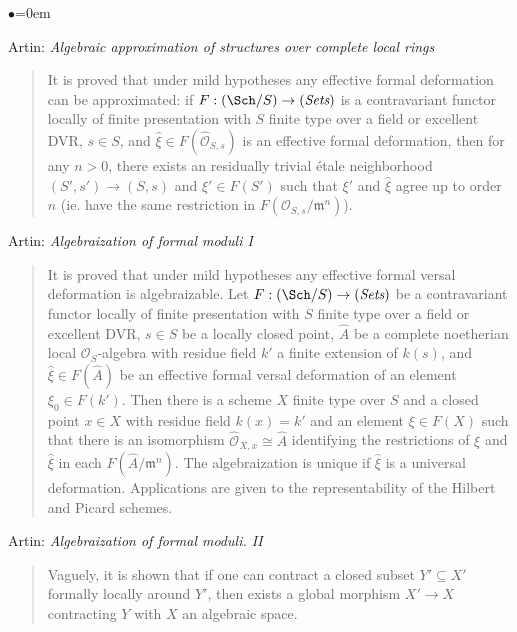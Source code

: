 \begin{list}{$\bullet$}{\leftmargin=0em}
\item Artin: \emph{Algebraic approximation of structures over
complete local rings} \cite{Artin-Algebraic-Approximation}
\begin{quote}
It is proved that under mild hypotheses any effective formal deformation can be
approximated: if $F: (\Sch/S) \to (\textit{Sets})$
is a contravariant functor
locally of finite presentation with $S$ finite type over a field or excellent
DVR, $s \in S$, and $\hat{\xi} \in F(\hat{\mathcal{O}}_{S, s})$ is an effective
formal
deformation, then for any $n > 0$, there exists an residually trivial \'etale
neighborhood $(S', s') \to (S, s)$ and $\xi' \in F(S')$ such that $\xi'$ and
$\hat{\xi}$ agree up to order $n$ (ie. have the same restriction in
$F(\mathcal{O}_{S, s} / \mathfrak m^n)$).
\end{quote}
\smallskip
\item
Artin: \emph{Algebraization of formal moduli I} \cite{ArtinI}
\begin{quote}
It is proved that under mild hypotheses any effective formal versal deformation
is algebraizable. Let $F: (\Sch/S) \to (\textit{Sets})$ be a
contravariant functor
locally of finite presentation with $S$ finite type over a field or excellent
DVR, $s \in S$ be a locally closed point, $\hat A$ be a complete noetherian
local $\mathcal{O}_S$-algebra with residue field $k'$ a finite extension of
$k(s)$,
and $\hat{\xi} \in F(\hat A)$ be an effective formal versal deformation of an
element $\xi_0 \in F(k')$. Then there is a scheme $X$ finite type over $S$ and
a closed point $x \in X$ with residue field $k(x) = k'$ and an element $\xi \in
F(X)$ such that there is an isomorphism $\hat{\mathcal{O}}_{X, x} \cong \hat{A}$
identifying the restrictions of $\xi$ and $\hat{\xi}$ in each $F(\hat A /
\mathfrak m^n)$. The algebraization is unique if $\hat{\xi}$ is a universal
deformation. Applications are given to the representability of the Hilbert
and Picard schemes.
\end{quote}
\smallskip
\item Artin: \emph{Algebraization of formal moduli. II}
\cite{ArtinII}
\begin{quote}
Vaguely, it is shown that if one can contract a closed subset $Y' \subseteq X'$
formally locally around $Y'$, then exists a global morphism $X' \to X$
contracting $Y$ with $X$ an algebraic space.
\end{quote}
\smallskip
\item

\end{list}

